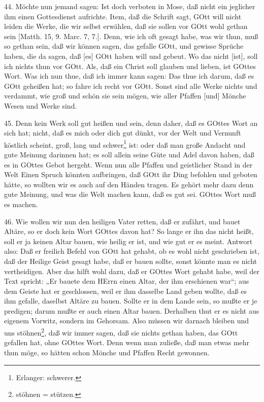 44. Möchte nun jemand sagen: Ist doch verboten in Mose, daß nicht ein jeglicher ihm einen Gottesdienst aufrichte. Item, daß die Schrift sagt, GOtt will nicht leiden die Werke, die wir selbst erwählen, daß sie sollen vor GOtt wohl gethan sein [Matth. 15, 9. Marc. 7, 7.]. Denn, wie ich oft gesagt habe, was wir thun, muß so gethan sein, daß wir können sagen, das gefalle GOtt, und gewisse Sprüche haben, die da sagen, daß [es] GOtt haben will und gebeut. Wo das nicht [ist], soll ich nichts thun vor GOtt. Als, daß ein Christ soll glauben und lieben, ist GOttes Wort. Was ich nun thue, daß ich immer kann sagen: Das thue ich darum, daß es GOtt geheißen hat; so fahre ich recht vor GOtt. Sonst sind alle Werke nichts und verdammt, wie groß und schön sie sein mögen, wie aller Pfaffen [und] Mönche Wesen und Werke sind.

45. Denn kein Werk soll gut heißen und sein, denn daher, daß es GOttes Wort an sich hat; nicht, daß es mich oder dich gut dünkt, vor der Welt und Vernunft köstlich scheint, groß, lang und schwer\footnote{Erlanger: schwerer.} ist: oder daß man große Andacht und gute Meinung darinnen hat; es soll allein seine Güte und Adel davon haben, daß es in GOttes Gebot hergeht. Wenn nun alle Pfaffen und geistlicher Stand in der Welt Einen Spruch könnten aufbringen, daß GOtt ihr Ding befohlen und geboten hätte, so wollten wir es auch auf den Händen tragen. Es gehört mehr dazu denn gute Meinung, und was die Welt machen kann, daß es gut sei. GOttes Wort muß es machen.

46. Wie wollen wir nun den heiligen Vater retten, daß er zufährt, und bauet Altäre, so er doch kein Wort GOttes davon hat? So lange er ihn das nicht heißt, soll er ja keinen Altar bauen, wie heilig er ist, und wie gut er es meint. Antwort also: Daß er freilich Befehl von GOtt hat gehabt, ob es wohl nicht geschrieben ist, daß der Heilige Geist gesagt habe, daß er bauen sollte, sonst könnte man es nicht vertheidigen. Aber das hilft wohl dazu, daß er GOttes Wort gehabt habe, weil der Text spricht: „Er bauete dem HErrn einen Altar, der ihm erschienen war“; aus dem Geiste hat er geschlossen, weil er ihm dasselbe Land geben wollte, daß es ihm gefalle, daselbst Altäre zu bauen. Sollte er in dem Lande sein, so mußte er je predigen; darum mußte er auch einen Altar bauen. Derhalben thut er es nicht aus eigenem Vorwitz, sondern im Gehorsam. Also müssen wir darnach bleiben und uns stöhnen\footnote{stöhnen = stützen.}, daß wir immer sagen, daß sie nichts gethan haben, das GOtt gefallen hat, ohne GOttes Wort. Denn wenn man zuließe, daß man etwas mehr thun möge, so hätten schon Mönche und Pfaffen Recht gewonnen.

